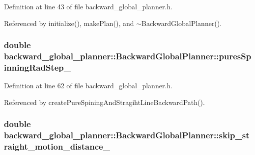 Definition at line 43 of file backward\+\_\+global\+\_\+planner.\+h.



Referenced by initialize(), make\+Plan(), and $\sim$\+Backward\+Global\+Planner().

\subsubsection[{\texorpdfstring{pures\+Spinning\+Rad\+Step\+\_\+}{puresSpinningRadStep_}}]{\setlength{\rightskip}{0pt plus 5cm}double backward\+\_\+global\+\_\+planner\+::\+Backward\+Global\+Planner\+::pures\+Spinning\+Rad\+Step\+\_\+\hspace{0.3cm}{\ttfamily [private]}}\hypertarget{classbackward__global__planner_1_1BackwardGlobalPlanner_aaf07dcf11683d0c3e9df474d82a16468}{}\label{classbackward__global__planner_1_1BackwardGlobalPlanner_aaf07dcf11683d0c3e9df474d82a16468}


Definition at line 62 of file backward\+\_\+global\+\_\+planner.\+h.



Referenced by create\+Pure\+Spining\+And\+Stragiht\+Line\+Backward\+Path().

\subsubsection[{\texorpdfstring{skip\+\_\+straight\+\_\+motion\+\_\+distance\+\_\+}{skip_straight_motion_distance_}}]{\setlength{\rightskip}{0pt plus 5cm}double backward\+\_\+global\+\_\+planner\+::\+Backward\+Global\+Planner\+::skip\+\_\+straight\+\_\+motion\+\_\+distance\+\_\+\hspace{0.3cm}{\ttfamily [private]}}\hypertarget{classbackward__global__planner_1_1BackwardGlobalPlanner_a307c9795c48fa4f6232cf8333704f27f}{}\label{classbackward__global__planner_1_1BackwardGlobalPlanner_a307c9795c48fa4f6232cf8333704f27f}


